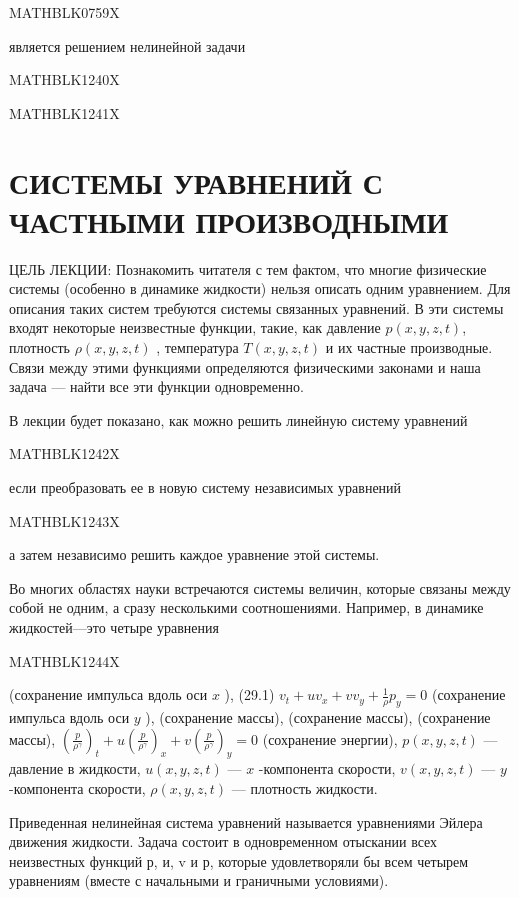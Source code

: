 \documentclass[
]{article}
\begin{document}
MATHBLK0759X

является решением нелинейной задачи

MATHBLK1240X

MATHBLK1241X

\section{СИСТЕМЫ УРАВНЕНИЙ С ЧАСТНЫМИ
ПРОИЗВОДНЫМИ}\label{ux441ux438ux441ux442ux435ux43cux44b-ux443ux440ux430ux432ux43dux435ux43dux438ux439-ux441-ux447ux430ux441ux442ux43dux44bux43cux438-ux43fux440ux43eux438ux437ux432ux43eux434ux43dux44bux43cux438}

ЦЕЛЬ ЛЕКЦИИ: Познакомить читателя с тем фактом, что многие физические
системы (особенно в динамике жидкости) нельзя описать одним уравнением.
Для описания таких систем требуются системы связанных уравнений. В эти
системы входят некоторые неизвестные функции, такие, как давление
\(p(x, y, z, t)\), плотность \(\rho(x, y, z, t)\) , температура
\(T(x, y, z, t)\) и их частные производные. Связи между этими функциями
определяются физическими законами и наша задача --- найти все эти
функции одновременно.

В лекции будет показано, как можно решить линейную систему уравнений

MATHBLK1242X

если преобразовать ее в новую систему независимых уравнений

MATHBLK1243X

а затем независимо решить каждое уравнение этой системы.

Во многих областях науки встречаются системы величин, которые связаны
между собой не одним, а сразу несколькими соотношениями. Например, в
динамике жидкостей---это четыре уравнения

MATHBLK1244X

(сохранение импульса вдоль оси \(x\) ), (29.1)
\(v_t + uv_x + vv_y + \frac{1}{\rho} p_y = 0\) (сохранение импульса
вдоль оси \(y\) ), (сохранение массы), (сохранение массы), (сохранение
массы),
\(\left(\frac{p}{\rho^{\gamma}}\right)_t + u\left(\frac{p}{\rho^{\gamma}}\right)_x + v\left(\frac{p}{\rho^{\gamma}}\right)_y = 0\)
(сохранение энергии), \(p(x, y, z, t)\) --- давление в жидкости,
\(u(x, y, z, t)\) --- \(x\) -компонента скорости, \(v(x, y, z, t)\) ---
\(y\) -компонента скорости, \(\rho(x, y, z, t)\) --- плотность жидкости.

Приведенная нелинейная система уравнений называется уравнениями Эйлера
движения жидкости. Задача состоит в одновременном отыскании всех
неизвестных функций р, и, v и р, которые удовлетворяли бы всем четырем
уравнениям (вместе с начальными и граничными условиями).
\end{document}
